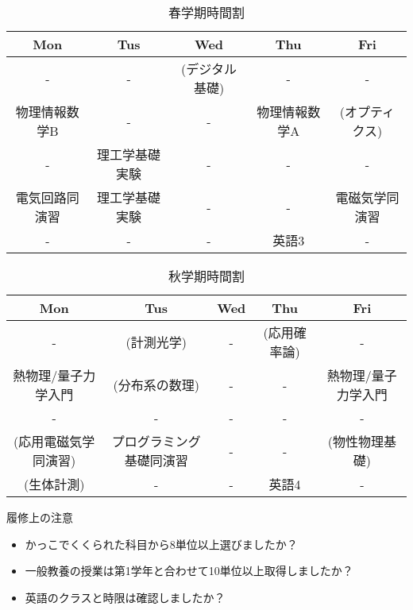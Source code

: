 \documentclass{ltjsarticle}
\begin{document}
  \begin{table}[htbp]
    \caption{春学期時間割}
    \centering
    \begin{tabular}{c|c|c|c|c}
      Mon & Tus & Wed & Thu & Fri \\ \hline\hline
      - & - & (デジタル基礎) & - & - \\ \hline
      物理情報数学B & - & - & 物理情報数学A & (オプティクス) \\ \hline
      - & 理工学基礎実験   & - & - & - \\ \hline
      電気回路同演習 & 理工学基礎実験 & - & - & 電磁気学同演習 \\ \hline
      - & - & - & 英語3 & - \\
    \end{tabular}
  \end{table}
  \begin{table}[htbp]
    \caption{秋学期時間割}
    \centering
    \begin{tabular}{c|c|c|c|c}
      Mon & Tus & Wed & Thu & Fri \\ \hline\hline
      - & (計測光学) & - & (応用確率論) & - \\ \hline
      熱物理/量子力学入門& (分布系の数理) & - & - & 熱物理/量子力学入門 \\ \hline
      - &- & - & - & - \\ \hline
      (応用電磁気学同演習)& プログラミング基礎同演習 & - & - & (物性物理基礎)\\ \hline
      (生体計測)& - & - & 英語4 & - \\
    \end{tabular}
  \end{table}
  履修上の注意
  \begin{itemize}
    \item かっこでくくられた科目から8単位以上選びましたか？
    \item 一般教養の授業は第1学年と合わせて10単位以上取得しましたか？
    \item 英語のクラスと時限は確認しましたか？
  \end{itemize}
\end{document}
